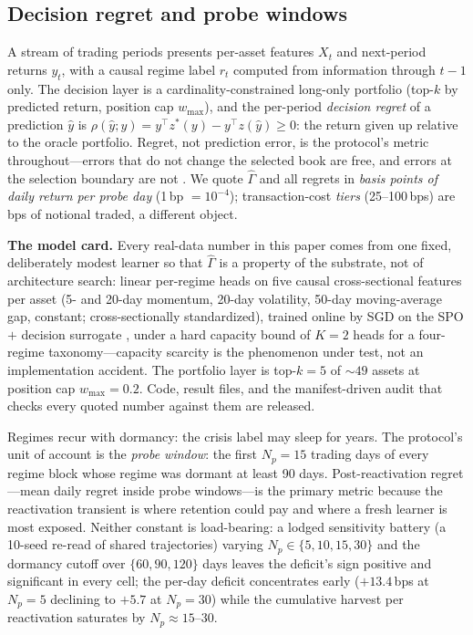\documentclass[sigconf,anonymous]{acmart}
\newcommand{\G}{\hat\Gamma}
\newcommand{\regret}{\rho}
\begin{document}
\subsection{Decision regret and probe windows}

A stream of trading periods presents per-asset features $X_t$ and
next-period returns $y_t$, with a causal regime label $r_t$ computed from
information through $t-1$ only. The decision layer is a
cardinality-constrained long-only portfolio (top-$k$ by predicted return,
position cap $w_{\max}$), and the per-period \emph{decision regret} of a
prediction $\hat y$ is
$\regret(\hat y; y) = y^\top z^*(y) - y^\top z(\hat y) \ge 0$: the return
given up relative to the oracle portfolio. Regret, not prediction error,
is the protocol's metric throughout---errors that do not change the
selected book are free, and errors at the selection boundary are not
\cite{elmachtoub2022smart}. We quote $\G$ and all regrets in
\emph{basis points of daily return per probe day} (1\,bp $=10^{-4}$);
transaction-cost \emph{tiers} (25--100\,bps) are bps of notional
traded, a different object.

\textbf{The model card.} Every real-data number in this paper comes
from one fixed, deliberately modest learner so that $\G$ is a property
of the substrate, not of architecture search: linear per-regime heads
on five causal cross-sectional features per asset (5- and 20-day
momentum, 20-day volatility, 50-day moving-average gap, constant;
cross-sectionally standardized), trained online by SGD on the SPO$+$
decision surrogate \cite{elmachtoub2022smart}, under a hard capacity
bound of $K{=}2$ heads for a four-regime taxonomy---capacity scarcity
is the phenomenon under test, not an implementation accident. The
portfolio layer is top-$k{=}5$ of ${\sim}49$ assets at position cap
$w_{\max}{=}0.2$. Code, result files, and the manifest-driven audit
that checks every quoted number against them are released.

Regimes recur with dormancy: the crisis label may sleep for years. The
protocol's unit of account is the \emph{probe window}: the first
$N_p = 15$ trading days of every regime block whose regime was dormant at
least 90 days. Post-reactivation regret---mean daily regret inside probe
windows---is the primary metric because the reactivation transient is
where retention could pay and where a fresh learner is most exposed.
Neither constant is load-bearing: a lodged sensitivity battery (a
10-seed re-read of shared trajectories) varying
$N_p \in \{5, 10, 15, 30\}$ and the dormancy cutoff over
$\{60, 90, 120\}$ days leaves the deficit's sign positive and
significant in every cell; the per-day deficit concentrates early
($+13.4$\,bps at $N_p{=}5$ declining to $+5.7$ at $N_p{=}30$) while
the cumulative harvest per reactivation saturates by
$N_p \approx 15$--30.
\end{document}
